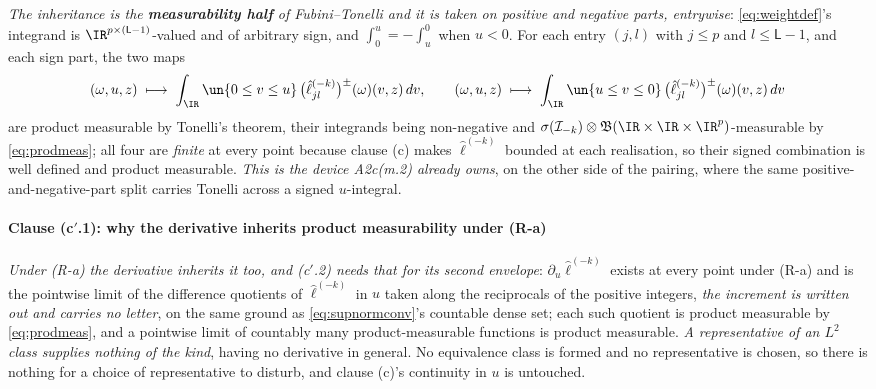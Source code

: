 \emph{The inheritance is the
\textbf{measurability half} of Fubini--Tonelli and it is taken on positive and negative parts,
entrywise}: \eqref{eq:weightdef}'s integrand is $\IR^{p\times(\mathsf L-1)}$-valued and
of arbitrary sign, and $\int_0^u=-\int_u^0$ when $u<0$. For each entry $(j,l)$ with $j\le p$ and
$l\le\mathsf L-1$, and each sign part, the
two maps
\[
(\omega,u,z)\;\longmapsto\;\int_\IR\un\{0\le v\le u\}\,\big(\hat\ell^{(-k)}_{jl}\big)^{\pm}(\omega)(v,z)\,dv,
\qquad
(\omega,u,z)\;\longmapsto\;\int_\IR\un\{u\le v\le0\}\,\big(\hat\ell^{(-k)}_{jl}\big)^{\pm}(\omega)(v,z)\,dv
\]
are product measurable by Tonelli's theorem, their integrands being non-negative and
$\sigma(\mathcal I_{-k})\otimes\mathfrak B(\IR\times\IR\times\IR^{p})$-measurable by \eqref{eq:prodmeas};
all four are \emph{finite} at every point because clause \textup{(c)} makes $\hat\ell^{(-k)}$ bounded at
each realisation, so their signed combination is well defined and product measurable. \emph{This is the
device A2c\textup{(m.2)} already owns}, on the other side of the
pairing, where the same positive-and-negative-part split carries Tonelli across a signed
$u$-integral.

\paragraph{Clause \textup{(c$'$.1)}: why the derivative inherits product measurability under (R-a)}

\emph{Under (R-a) the derivative inherits it too, and \textup{(c$'$.2)} needs that for its second
envelope}: $\partial_u\hat\ell^{(-k)}$ exists at every point under (R-a) and is the pointwise limit
of the difference quotients of $\hat\ell^{(-k)}$ in $u$ taken along the reciprocals of the positive
integers, \emph{the increment is written out and carries no letter}, on the same ground as
\eqref{eq:supnormconv}'s countable dense set; each such quotient is product measurable by
\eqref{eq:prodmeas}, and a pointwise limit of countably many product-measurable functions is product
measurable. \emph{A representative of an $L^{2}$ class supplies nothing of the kind}, having no derivative
in general.
No equivalence class is formed and no representative is chosen, so there is nothing
for a choice of representative to disturb, and clause \textup{(c)}'s continuity in $u$ is untouched.

